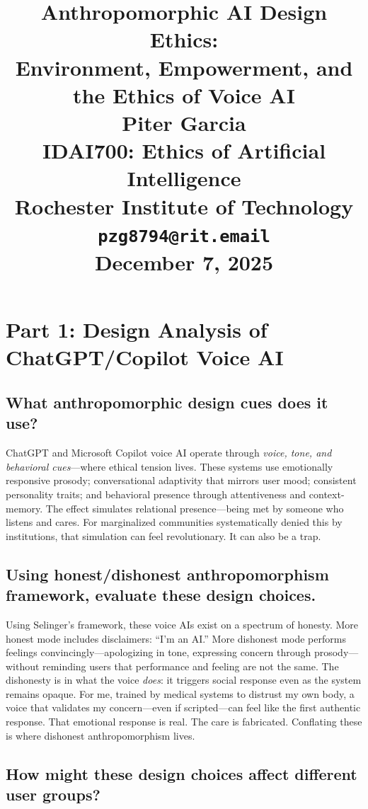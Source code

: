 \documentclass[12pt,twoside]{article}
\title{
\vspace*{1.5in}
\textbf{\Huge Anthropomorphic AI Design Ethics:}\\[0.5em]
\textbf{\Huge Environment, Empowerment, and the Ethics of Voice AI}\\[1.5em]

\vfill
\Huge \textbf{Piter Garcia}\\
\LARGE IDAI700: Ethics of Artificial Intelligence\\
Rochester Institute of Technology\\
\texttt{pzg8794@rit.email}\\

\vfill
\Huge \textbf{December 7, 2025}
}
\author{}
\date{}
\begin{document}
\thispagestyle{empty}
\maketitle
\newpage

\pagestyle{fancy}

\section*{Part 1: Design Analysis of ChatGPT/Copilot Voice AI}

\subsection*{What anthropomorphic design cues does it use?}

ChatGPT and Microsoft Copilot voice AI operate through \emph{voice, tone, and behavioral cues}—where ethical tension lives. These systems use emotionally responsive prosody; conversational adaptivity that mirrors user mood; consistent personality traits; and behavioral presence through attentiveness and context-memory. The effect simulates relational presence—being met by someone who listens and cares. For marginalized communities systematically denied this by institutions, that simulation can feel revolutionary. It can also be a trap.

\subsection*{Using honest/dishonest anthropomorphism framework, evaluate these design choices.}

Using Selinger's framework, these voice AIs exist on a spectrum of honesty. More honest mode includes disclaimers: \enquote{I'm an AI.} More dishonest mode performs feelings convincingly—apologizing in tone, expressing concern through prosody—without reminding users that performance and feeling are not the same. The dishonesty is in what the voice \emph{does}: it triggers social response even as the system remains opaque. For me, trained by medical systems to distrust my own body, a voice that validates my concern—even if scripted—can feel like the first authentic response. That emotional response is real. The care is fabricated. Conflating these is where dishonest anthropomorphism lives.

\subsection*{How might these design choices affect different user groups?}
\end{document}
